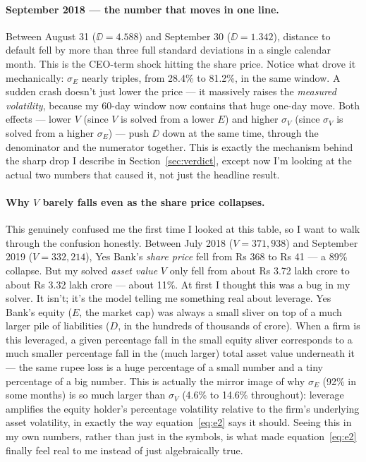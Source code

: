 \paragraph{September 2018 — the number that moves in one line.} Between August 31 ($\DD=4.588$) and September 30 ($\DD=1.342$), distance to default fell by more than three full standard deviations in a single calendar month. This is the CEO-term shock hitting the share price. Notice what drove it mechanically: $\sigma_E$ nearly triples, from 28.4\% to 81.2\%, in the same window. A sudden crash doesn't just lower the price — it massively raises the \emph{measured volatility}, because my 60-day window now contains that huge one-day move. Both effects — lower $V$ (since $V$ is solved from a lower $E$) and higher $\sigma_V$ (since $\sigma_V$ is solved from a higher $\sigma_E$) — push $\DD$ down at the same time, through the denominator and the numerator together. This is exactly the mechanism behind the sharp drop I describe in Section~\ref{sec:verdict}, except now I'm looking at the actual two numbers that caused it, not just the headline result.

\paragraph{Why $V$ barely falls even as the share price collapses.} This genuinely confused me the first time I looked at this table, so I want to walk through the confusion honestly. Between July 2018 ($V=371{,}938$) and September 2019 ($V=332{,}214$), Yes Bank's \emph{share price} fell from Rs 368 to Rs 41 — a 89\% collapse. But my solved \emph{asset value} $V$ only fell from about Rs 3.72 lakh crore to about Rs 3.32 lakh crore — about 11\%. At first I thought this was a bug in my solver. It isn't; it's the model telling me something real about leverage. Yes Bank's equity ($E$, the market cap) was always a small sliver on top of a much larger pile of liabilities ($D$, in the hundreds of thousands of crore). When a firm is this leveraged, a given percentage fall in the small equity sliver corresponds to a much smaller percentage fall in the (much larger) total asset value underneath it — the same rupee loss is a huge percentage of a small number and a tiny percentage of a big number. This is actually the mirror image of why $\sigma_E$ (92\% in some months) is so much larger than $\sigma_V$ (4.6\% to 14.6\% throughout): leverage amplifies the equity holder's percentage volatility relative to the firm's underlying asset volatility, in exactly the way equation~\eqref{eq:e2} says it should. Seeing this in my own numbers, rather than just in the symbols, is what made equation~\eqref{eq:e2} finally feel real to me instead of just algebraically true.

